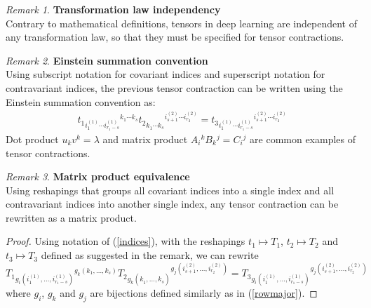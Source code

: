 \documentclass{article}
\theoremstyle{definition}
\theoremstyle{remark}
\newtheorem{remark}{Remark}[section]
\theoremstyle{plain}
\begin{document}
\begin{remark}\textbf{Transformation law independency}\\
Contrary to mathematical definitions, tensors in deep learning are independent of any transformation law, so that they must be specified for tensor contractions.
\end{remark}

\begin{remark}\textbf{Einstein summation convention}\\
Using subscript notation for covariant indices and superscript notation for contravariant indices, the previous tensor contraction can be written using the Einstein summation convention as:
\begin{gather}
t_1 \hspace{0pt}_{i_1^{(1)} \cdots i_{r_1-s}^{(1)} } \hspace{0pt}^{ k_1 \cdots k_s} 
t_2 \hspace{0pt}_{ k_1^{\phantom{(}} \cdots k_s^{\phantom{(}}} \hspace{0pt}^{i_{s+1}^{(2)} \cdots i_{r_2}^{(2)}} =
t_3 \hspace{0pt}_ {i_1^{(1)} \cdots i_{r_1-s}^{(1)} } \hspace{0pt}^{i_{s+1}^{(2)} \cdots i_{r_2}^{(2)}}
\label{indices}
\end{gather}
Dot product $u_k v^k = \lambda $ and matrix product $A_i\hspace{0pt}^k B_k\hspace{0pt}^j = C_i\hspace{0pt}^j$ are common examples of tensor contractions.
\end{remark}

\begin{remark}\textbf{Matrix product equivalence}\\
Using reshapings that groups all covariant indices into a single index and all contravariant indices into another single index, any tensor contraction can be rewritten as a matrix product.
\label{rq:matprodeq}
\end{remark}
\begin{proof}
Using notation of (\ref{indices}), with the reshapings $t_1 \mapsto T_1$, $t_2 \mapsto T_2$ and $t_3 \mapsto T_3$ defined as suggested in the remark, we can rewrite
$$
T_1 \hspace{0pt}_{g_i(i_1^{(1)}, \ldots, i_{r_1-s}^{(1)})} \hspace{0pt}^{g_k(k_1, \ldots, k_s)} 
T_2 \hspace{0pt}_{g_k(k_1^{\phantom{(}}, \ldots, k_s^{\phantom{(}})} \hspace{0pt}^{g_j(i_{s+1}^{(2)}, \ldots, i_{r_2}^{(2)})} =
T_3 \hspace{0pt}_ {g_i(i_1^{(1)}, \ldots, i_{r_1-s}^{(1)})} \hspace{0pt}^{g_j(i_{s+1}^{(2)}, \ldots, i_{r_2}^{(2)})}
$$
where $g_i$, $g_k$ and $g_j$ are bijections defined similarly as in (\ref{rowmajor}).
\end{proof}
\end{document}
